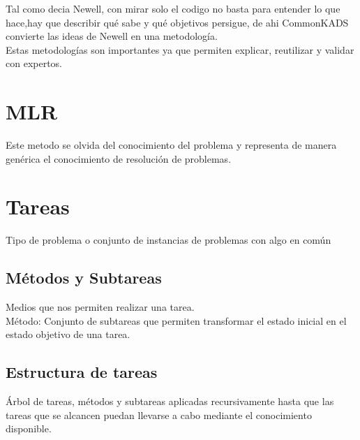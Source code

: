 \documentclass{article}
\begin{document}
    Tal como decia Newell, con mirar solo el codigo no basta para entender lo que hace,hay que describir qué sabe y qué objetivos persigue, de ahi CommonKADS convierte las ideas de Newell en una metodología. \\

    Estas metodologías son importantes ya que permiten explicar, reutilizar y validar con expertos. \\

\section{MLR}
    Este metodo se olvida del conocimiento del problema y representa de manera genérica el conocimiento de resolución de problemas. 

\section{Tareas}
    Tipo de problema o conjunto de instancias de problemas con algo en común\\

    \subsection{Métodos y Subtareas}
        Medios que nos permiten realizar una tarea.\\

        Método: Conjunto de subtareas que permiten transformar el estado inicial en el estado objetivo de una tarea.
    \subsection{Estructura de tareas}
        Árbol de tareas, métodos y subtareas aplicadas recursivamente hasta que las tareas que se alcancen puedan llevarse a cabo mediante el conocimiento disponible.
    

    

    
    

    
    
        
\end{document}

